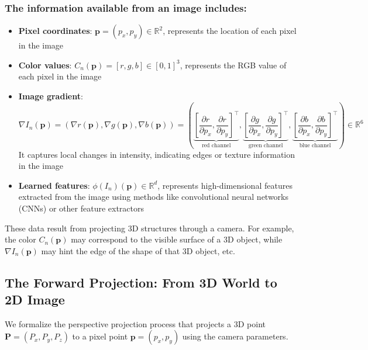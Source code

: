 \documentclass[12pt]{article}
\begin{document}
\subsubsection*{The information available from an image includes:}
\begin{itemize}
    \item \textbf{Pixel coordinates}: \( \mathbf{p} = (p_x, p_y) \in \mathbb{R}^2 \), represents the location of each pixel in the image
    \item \textbf{Color values}: \( C_n(\mathbf{p}) = [r, g, b] \in [0,1]^3 \), represents the RGB value of each pixel in the image
    \item \textbf{Image gradient}:
    \begin{equation}
        \nabla I_n(\mathbf{p}) = \left( \nabla r(\mathbf{p}), \nabla g(\mathbf{p}), \nabla b(\mathbf{p}) \right) = \left( \underbrace{\left[ \frac{\partial r}{\partial p_x}, \frac{\partial r}{\partial p_y} \right]^\top}_{\text{red channel}}, \underbrace{\left[ \frac{\partial g}{\partial p_x}, \frac{\partial g}{\partial p_y} \right]^\top}_{\text{green channel}}, \underbrace{\left[ \frac{\partial b}{\partial p_x}, \frac{\partial b}{\partial p_y} \right]^\top}_{\text{blue channel}} \right) \in \mathbb{R}^6 \label{eq:gradient}
    \end{equation}
    It captures local changes in intensity, indicating edges or texture information in the image
    \item \textbf{Learned features}: \( \phi(I_n)(\mathbf{p}) \in \mathbb{R}^d \), represents high-dimensional features extracted from the image using methods like convolutional neural networks (CNNs) or other feature extractors
\end{itemize}
These data result from projecting 3D structures through a camera. For example, the color \( C_n(\mathbf{p}) \) may correspond to the visible surface of a 3D object, while \( \nabla I_n(\mathbf{p}) \) may hint the edge of the shape of that 3D object, etc.

\newpage

\subsection{The Forward Projection: From 3D World to 2D Image}
We formalize the perspective projection process that projects a 3D point \( \mathbf{P} = (P_x, P_y, P_z) \) to a pixel point \( \mathbf{p} = (p_x, p_y) \) using the camera parameters.
\end{document}
